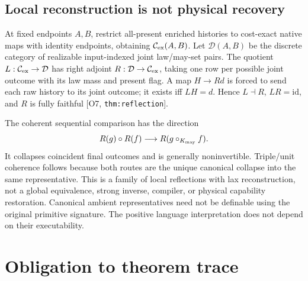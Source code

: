 \documentclass[11pt,a4paper]{article}
\theoremstyle{definition}
\newcommand{\id}{\mathrm{id}}
\newcommand{\Addr}[2]{\textup{[#1, \texttt{#2}]}}
\begin{document}
\subsection{Local reconstruction is not physical recovery}
At fixed endpoints \(A,B\), restrict all-present enriched histories to
cost-exact native maps with identity endpoints, obtaining
\(\mathcal C_{\rm ex}(A,B)\). Let \(\mathcal D(A,B)\) be the discrete
category of realizable input-indexed joint law/may-set pairs. The quotient
\(L:\mathcal C_{\rm ex}\to\mathcal D\) has right adjoint
\(R:\mathcal D\to\mathcal C_{\rm ex}\), taking one row per possible
joint outcome with its law mass and present flag. A map \(H\to Rd\)
is forced to send each raw history to its joint outcome; it exists iff
\(LH=d\). Hence \(L\dashv R\), \(LR=\id\), and \(R\) is fully
faithful \Addr{O7}{thm:reflection}.

The coherent sequential comparison has the direction
\[
 R(g)\circ R(f)\longrightarrow R(g\circ_{K_{\rm may}} f).
\]
It collapses coincident final outcomes and is generally noninvertible.
Triple/unit coherence follows because both routes are the unique canonical
collapse into the same representative. This is a family of local
reflections with lax reconstruction, not a global equivalence, strong
inverse, compiler, or physical capability restoration. Canonical ambient
representatives need not be definable using the original primitive signature.
The positive language interpretation does not depend on their executability.

\section{Obligation to theorem trace}\label{sec:trace}
\end{document}
